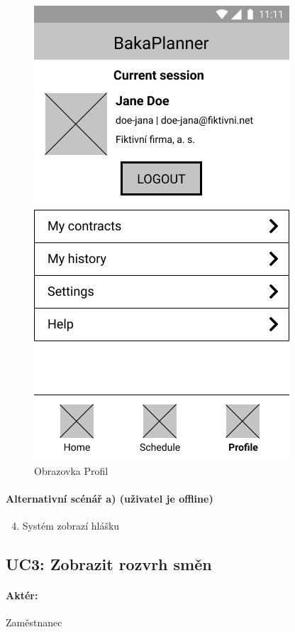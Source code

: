 \documentclass[twoside]{ctuthesis}
\begin{document}
\begin{figure}[h]
	\includegraphics[scale=.35]{img/main-profile.png}
	\caption{Obrazovka Profil}
	\label{fig:profile}
\end{figure}

\paragraph{Alternativní scénář a) (uživatel je offline)}

	\begin{enumerate}[label=\arabic*a]
		\setcounter{enumi}{3}
		\item Systém zobrazí hlášku 
	\end{enumerate}

\newpage
\subsection{UC3: Zobrazit rozvrh směn}
\paragraph{Aktér:} Zaměstnanec
\end{document}
